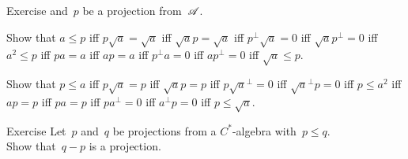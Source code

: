 \documentclass[a]{subfiles}
\begin{document}
\begin{parsec}
\begin{point}{Exercise}
and~$p$ be a projection from~$\mathscr{A}$.
\begin{point}%
Show that $a\leq p$
iff $p\sqrt{a} = \sqrt{a}$
iff $\sqrt{a}p = \sqrt{a}$
iff $p^\perp\sqrt{a} = 0$
iff $\sqrt{a}p^\perp = 0$
iff $a^2\leq p$
iff $p a  = a$
iff $ a p = a $
iff $p^\perp a  = 0$
iff $ap^\perp = 0$
iff $\sqrt{a}\leq p$.
\end{point}
\begin{point}%
Show that $p\leq a$
iff $p \sqrt{a} = p$
iff $\sqrt{a} p = p$
iff $ p\sqrt{a}^\perp = 0$
iff $\sqrt{a}^\perp p = 0$
iff $p\leq a^2$
iff $ap=p$
iff $pa = p$
iff $pa^\perp =0$
iff $a^\perp p =0$
iff $p\leq \sqrt{a}$.
\end{point}
\end{point}
\begin{point}{Exercise}%
Let~$p$ and~$q$ be projections from a $C^*$-algebra
with~$p\leq q$.\\
Show that~$q-p$ is a projection.
\end{point}
\end{parsec}
\end{document}
